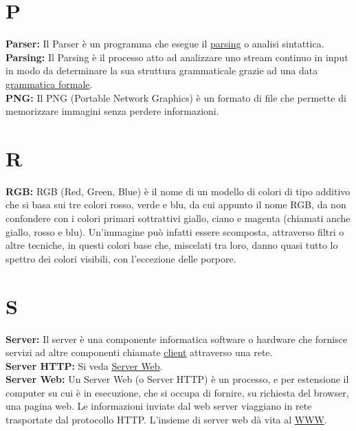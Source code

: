 \section*{P}
\hypertarget{parser}{}
\textbf{Parser:}
Il Parser \` e un programma che esegue il \hyperlink{parsing}{\underline{parsing}} o analisi sintattica.\\

\hypertarget{parsing}{}
\textbf{Parsing:}
Il Parsing \` e il processo atto ad analizzare uno stream continuo in input in modo da determinare la sua struttura grammaticale grazie ad una data \hyperlink{grmfrm}{\underline{grammatica formale}}.\\

\hypertarget{png}{}
\textbf{PNG:}
Il PNG (Portable Network Graphics) \`e un formato di file che permette di memorizzare immagini senza perdere informazioni.\\

\section*{R}
\hypertarget{rgb}{}
\textbf{RGB:}
RGB (Red, Green, Blue) \`e  il nome di un modello di colori di tipo additivo che si basa sui tre colori rosso, verde e blu, da cui appunto il nome RGB, da non confondere con i colori primari sottrattivi giallo, ciano e magenta (chiamati anche giallo, rosso e blu).
Un'immagine pu\`o  infatti essere scomposta, attraverso filtri o altre tecniche, in questi colori base che, miscelati tra loro, danno quasi tutto lo spettro dei colori visibili, con l'eccezione delle porpore.\\

\section*{S}
\hypertarget{server}{}
\textbf{Server:}
Il server \`e una componente informatica software o hardware che fornisce servizi ad altre componenti chiamate \hyperlink{client}{\underline{client}} attraverso una rete. \\

\hypertarget{serverhttp}{}
\textbf{Server HTTP:}
Si veda \hyperlink{serverweb}{\underline{Server Web}}.\\

\hypertarget{serverweb}{}
\textbf{Server Web:}
Un Server Web (o Server HTTP) \` e un processo, e per estensione il computer su cui \` e in esecuzione, che si occupa di fornire, su richiesta del browser, una pagina web. Le informazioni inviate dal web server viaggiano in rete trasportate dal protocollo HTTP. L'insieme di server web d\` a vita al \hyperlink{www}{\underline{WWW}}.\\ 

